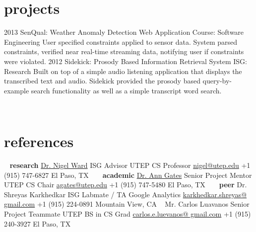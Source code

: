 \documentclass[]{friggeri-cv} %
\begin{document}

\section{projects}

\begin{entrylist}
\entry
{2013}
{SenQual: Weather Anomaly Detection Web Application}
{Course: Software Engineering}
{User specified constraints applied to sensor data. System parsed constraints, verified near real-time streaming data, notifying user if constraints were violated.}
\entry
{2012}
{Sidekick: Prosody Based Information Retrieval System}
{ISG: Research}
{Built on top of a simple audio listening application that displays the transcribed text and audio. Sidekick provided the prosody based query-by-example search functionality as well as a simple transcript word search.}
\end{entrylist}


\newpage
\clearpage
\begin{aside2}
~
~
\section{references}
~
\textbf{research}
\href{http://www.cs.utep.edu/nigel/}{Dr. Nigel Ward}
ISG Advisor
UTEP CS Professor
\href{mailto:nigel@utep.edu}{nigel@utep.edu}
+1 (915) 747-6827
El Paso, TX
~
~
\textbf{academic}
\href{http://www.cs.utep.edu/agates/}{Dr. Ann Gates}
Senior Project Mentor
UTEP CS Chair
\href{mailto:agates@utep.edu}{agates@utep.edu}
+1 (915) 747-5480
El Paso, TX
~
~
\textbf{peer}
Dr. Shreyas Karkhedkar
ISG Labmate / TA
Google Analytics
\href{mailto:karkhedkar.shreyas@gmail.com}{karkhedkar.shreyas@
gmail.com}
+1 (915) 224-0891
Mountain View, CA
~
Mr. Carlos Luavanos
\small{Senior Project Teammate}
UTEP BS in CS Grad
\href{mailto:carlos.e.luevanos@gmail.com}{carlos.e.luevanos@
gmail.com}
+1 (915) 240-3927
El Paso, TX
\end{aside2}
\end{document}
